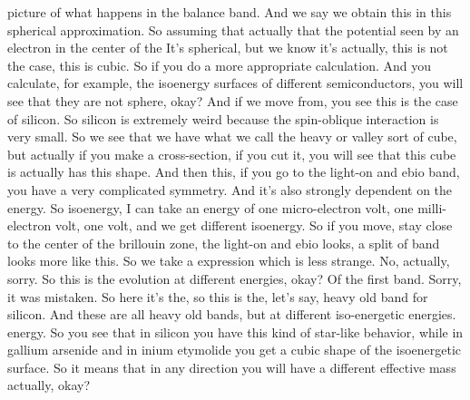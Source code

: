 picture of what happens in the balance band. And we say we obtain this in this spherical approximation. So assuming that actually that the potential seen by an electron in the center of the It's spherical, but we know it's actually, this is not the case, this is cubic. So if you do a more appropriate calculation.
And you calculate, for example, the isoenergy surfaces of different semiconductors, you will see that they are not sphere, okay? And if we move from, you see this is the case of silicon. So silicon is extremely weird because the spin-oblique interaction is very small. So we see that we have what we call the heavy or valley sort of cube, but actually if you make a cross-section, if you cut it, you will see that this cube is actually has this shape. And then this, if you go to the light-on and ebio band, you have a very complicated symmetry. And it's also strongly dependent on the energy. So isoenergy, I can take an energy of one micro-electron volt, one milli-electron volt, one volt, and we get different isoenergy. So if you move, stay close to the center of the brillouin zone, the light-on and ebio looks, a split of band looks more like this. So we take a expression which is less strange. No, actually, sorry. So this is the evolution at different energies, okay? Of the first band. Sorry, it was mistaken. So here it's the, so this is the, let's say, heavy old band for silicon. And these are all heavy old bands, but at different iso-energetic energies. energy. So you see that in silicon you have this kind of star-like behavior, while in gallium arsenide and in inium etymolide you get a cubic shape of the isoenergetic surface. So it means that in any direction you will have a different effective mass actually, okay?

